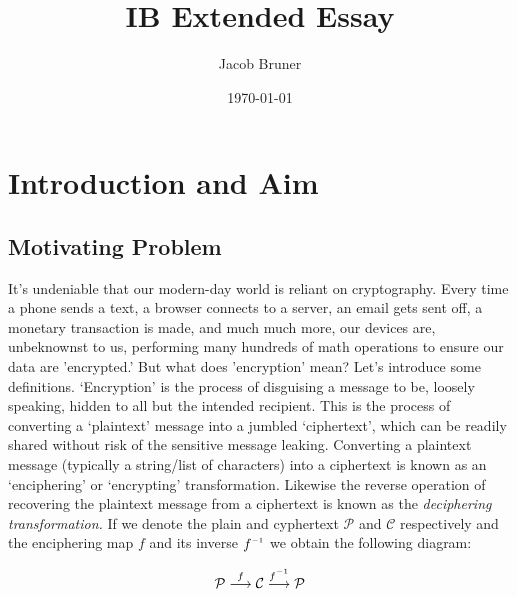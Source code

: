 \documentclass[11pt,a4paper]{article}
\author{Jacob Bruner}
\title{IB Extended Essay}
\date{\today}
\newcommand{\inv}{^{\raisebox{.2ex}{$\scriptscriptstyle-1$}}}
\begin{document}
\maketitle
\tableofcontents

\pagebreak

\section{Introduction and Aim}
\subsection{Motivating Problem}
It's undeniable that our modern-day world is reliant on cryptography. Every time a phone sends a text, a browser connects to a server, an email gets sent off, a monetary transaction is made, and much much more, our devices are, unbeknownst to us, performing many hundreds of math operations to ensure our data are 'encrypted.' But what does 'encryption' mean? Let's introduce some definitions. ‘Encryption’ is the process of disguising a message to be, loosely speaking, hidden to all but the intended recipient. This is the process of converting a ‘plaintext’ message into a jumbled ‘ciphertext’, which can be readily shared without risk of the sensitive message leaking. Converting a plaintext message (typically a string/list of characters) into a ciphertext is known as an ‘enciphering’ or ‘encrypting’ transformation. Likewise the reverse operation of recovering the plaintext message from a ciphertext is known as the \textit{deciphering transformation.}\autocite[54]{koblitz} If we denote the plain and cyphertext $\mathcal{P}$ and $\mathcal{C}$ respectively and the enciphering map $f$ and its inverse $f\inv$ we obtain the following diagram:

$$ \mathcal{P} \overset{f}\longrightarrow \mathcal{C} \overset{f\inv}\longrightarrow \mathcal{P} $$
\end{document}
